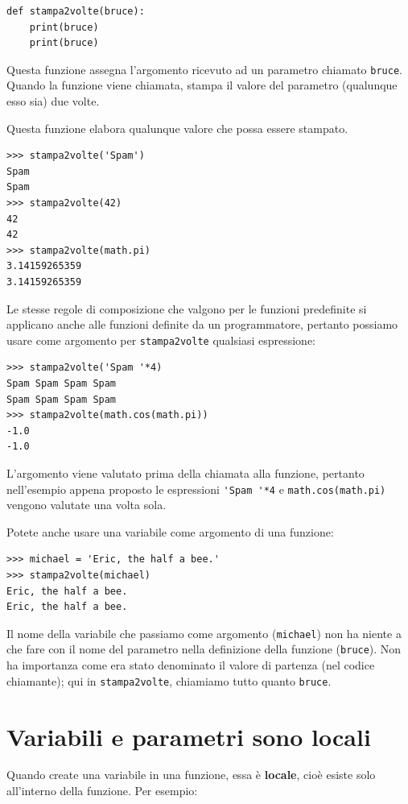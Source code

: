 \documentclass[10pt]{book}
\begin{document}
\begin{verbatim}
def stampa2volte(bruce):
    print(bruce)
    print(bruce)
\end{verbatim}
%
Questa funzione assegna l'argomento ricevuto ad un parametro chiamato {\tt bruce}. Quando la funzione viene chiamata, stampa il valore del parametro (qualunque esso sia) due volte.

Questa funzione elabora qualunque valore che possa essere stampato.

\begin{verbatim}
>>> stampa2volte('Spam')
Spam
Spam
>>> stampa2volte(42)
42
42
>>> stampa2volte(math.pi)
3.14159265359
3.14159265359
\end{verbatim}
%
Le stesse regole di composizione che valgono per le funzioni predefinite si applicano anche alle funzioni definite da un programmatore, pertanto possiamo usare come argomento per \verb"stampa2volte" qualsiasi espressione:

\begin{verbatim}
>>> stampa2volte('Spam '*4)
Spam Spam Spam Spam
Spam Spam Spam Spam
>>> stampa2volte(math.cos(math.pi))
-1.0
-1.0
\end{verbatim}
%
L'argomento viene valutato prima della chiamata alla funzione, pertanto nell'esempio appena proposto le espressioni \verb"'Spam '*4" e
{\tt math.cos(math.pi)} vengono valutate una volta sola.

Potete anche usare una variabile come argomento di una funzione:

\begin{verbatim}
>>> michael = 'Eric, the half a bee.'
>>> stampa2volte(michael)
Eric, the half a bee.
Eric, the half a bee.
\end{verbatim}
%
Il nome della variabile che passiamo come argomento ({\tt michael}) non ha niente a che fare con il nome del parametro nella definizione della funzione ({\tt bruce}).  Non ha importanza come era stato denominato il valore di partenza (nel codice chiamante); qui in \verb"stampa2volte", chiamiamo tutto quanto {\tt bruce}.


\section{Variabili e parametri sono locali}

Quando create una variabile in una funzione, essa è {\bf locale},
cioè esiste solo all'interno della funzione. Per esempio:
\end{document}
